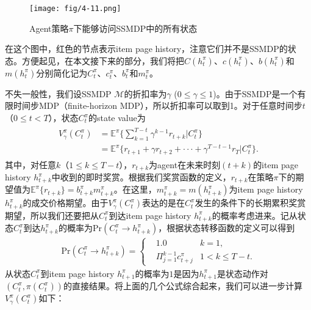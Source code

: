 \begin{figure}[!h]
\centering
\texttt{[image: fig/4-11.png]}
\caption{ Agent策略$\pi$下能够访问SSMDP中的所有状态}
\end{figure}

在这个图中，红色的节点表示item page history，注意它们并不是SSMDP的状态。方便起见，在本文接下来的部分，我们将把$C(h^{\pi}_t)$、$c(h^{\pi}_t)$、$b(h^{\pi}_t)$和$m(h^{\pi}_t)$分别简化记为$C^{\pi}_t$、$c^{\pi}_t$、$b^{\pi}_t$和$m^{\pi}_t$。

不失一般性，我们设SSMDP $\mathcal{M}$的折扣率为$\gamma$ ($0 \leq \gamma \leq 1$)。由于SSMDP是一个有限时间步MDP（finite-horizon MDP），所以折扣率可以取到1。对于任意时间步$t$（$0 \leq t < T$），状态$C^{\pi}_t$的state value为 
\begin{align}
\begin{split}
V^{\pi}_{\gamma}(C^{\pi}_t) &= \mathbb{E}^{\pi} \big\{ \sum_{k=1}^{T-t} \gamma^{k-1} r_{t+k} \big| C^{\pi}_t \big\} \\
&= \mathbb{E}^{\pi} \big\{ r_{t+1} + \gamma r_{t+2} + \cdot\cdot\cdot + \gamma^{T-t-1} r_{T} \big| C^{\pi}_t \big\}.
\end{split}
\end{align}
 其中，对任意$k$（$1 \leq k \leq T-t$），$r_{t+k}$为agent在未来时刻$(t+k)$的item page history $h^{\pi}_{t+k}$中收到的即时奖赏。根据我们奖赏函数的定义，$r_{t+k}$在策略$\pi$下的期望值为$\mathbb{E}^{\pi} \big\{ r_{t+k} \big\} = b^{\pi}_{t+k} m^{\pi}_{t+k}$。在这里，$m^{\pi}_{t+k} = m(h^{\pi}_{t+k})$为item page history $h^{\pi}_{t+k}$的成交价格期望。由于$V^{\pi}_{\gamma}(C^{\pi}_t)$表达的是在$C^{\pi}_t$发生的条件下的长期累积奖赏期望，所以我们还要把从$C^{\pi}_t$到达item page history $h^{\pi}_{t+k}$的概率考虑进来。记从状态$C^{\pi}_t$到达$h^{\pi}_{t+k}$的概率为$\text{Pr}( C^{\pi}_t \rightarrow h^{\pi}_{t+k})$，根据状态转移函数的定义可以得到
\begin{align}
\text{Pr}(C^{\pi}_t \rightarrow h^{\pi}_{t+k}) = \left\{
\begin{aligned}
&1.0 &k = 1, \quad\quad\quad \\
&\Pi^{k-1}_{j=1} c^{\pi}_{t+j} &1 < k \leq T-t.
\end{aligned}
\right.
\end{align}
 从状态$C^{\pi}_t$到item page history $h^{\pi}_{t+1}$的概率为$1$是因为$h^{\pi}_{t+1}$是状态动作对$(C^{\pi}_t, \pi(C^{\pi}_t))$的直接结果。将上面的几个公式综合起来，我们可以进一步计算$V^{\pi}_{\gamma}(C^{\pi}_t)$如下：
